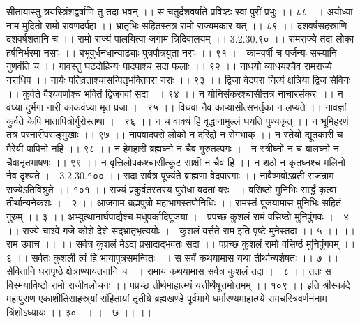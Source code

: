 सीतायास्तु त्रयस्त्रिंशद्वर्षाणि तु तदा भवन् ।।
स चतुर्दशवर्षांते प्रविष्टः स्वां पुरीं प्रभुः ।। ८८ ।।
अयोध्यां नाम मुदितो रामो रावणदर्पहा ।।
भ्रातृभिः सहितस्तत्र रामो राज्यमकार यत् ।। ८९ ।।
दशवर्षसहस्राणि दशवर्षशतानि च ।।
रामो राज्यं पालयित्वा जगाम त्रिदिवालयम् ।। 3.2.30.९० ।।
रामराज्ये तदा लोका हर्षनिर्भरमा नसाः ।।
बभूवुर्धनधान्याढ्याः पुत्रपौत्रयुता नराः ।। ९१ ।।
कामवर्षी च पर्जन्यः सस्यानि गुणवंति च ।।
गावस्तु घटदोहिन्यः पादपाश्च सदा फलाः ।। ९२ ।।
नाधयो व्याधयश्चैव रामराज्ये नराधिप ।।
नार्यः पतिव्रताश्चासन्पितृभक्तिपरा नराः ।। ९३ ।।
द्विजा वेदपरा नित्यं क्षत्रिया द्विज सेविनः ।।
कुर्वते वैश्यवर्णाश्च भक्तिं द्विजगवां सदा ।। ९४ ।।
न योनिसंकरश्चासीत्तत्र नाचारसंकरः ।।
न वंध्या दुर्भगा नारी काकवंध्या मृत प्रजा ।। ९५ ।।
विधवा नैव काप्यासीत्सभर्तृका न लप्यते ।।
नावज्ञां कुर्वते केपि मातापित्रोर्गुरोस्तथा ।। ९६ ।।
न च वाक्यं हि वृद्धानामुल्लं घयति पुण्यकृत् ।।
न भूमिहरणं तत्र परनारीपराङ्मुखाः ।। ९७ ।।
नापवादपरो लोको न दरिद्रो न रोगभाक् ।।
न स्तेयो द्यूतकारी च मैरेयी पापिनो नहि ।। ९८ ।।
न हेमहारी ब्रह्मघ्नो न चैव गुरुतल्पगः ।।
न स्त्रीघ्नो न च बालघ्नो न चैवानृतभाषणः ।। ९९ ।।
न वृत्तिलोपकश्चासीत्कूट साक्षी न चैव हि ।।
न शठो न कृतघ्नश्च मलिनो नैव दृश्यते ।। 3.2.30.१०० ।।
सदा सर्वत्र पूज्यंते ब्राह्मणा वेदपारगाः ।।
नावैष्णवोऽव्रती राजन्राम राज्येऽतिविश्रुते ।। १०१ ।।
राज्यं प्रकुर्वतस्तस्य पुरोधा वदतां वरः ।।
वसिष्ठो मुनिभिः सार्द्धं कृत्वा तीर्थान्यनेकशः ।। २ ।।
आजगाम ब्रह्मपुत्रो महाभागस्तपोनिधिः ।।
रामस्तं पूजयामास मुनिभिः सहितं गुरुम् ।। ३ ।।
अभ्युत्थानार्घपाद्यैश्च मधुपर्कादिपूजया ।।
प्रपच्छ कुशलं रामं वसिष्ठो मुनिपुंगवः ।। ४ ।।
राज्ये चाश्वे गजे कोशे देशे सद्भ्रातृभृत्ययोः ।।
कुशलं वर्त्तते राम इति पृष्टे मुनेस्तदा ।। ५ ।।
।। राम उवाच ।। ।।
सर्वत्र कुशलं मेऽद्य प्रसादाद्भवतः सदा ।।
पप्रच्छ कुशलं रामो वसिष्ठं मुनिपुंगवम् ।। ६ ।।
सर्वतः कुशली त्वं हि भार्यापुत्रसमन्वितः ।।
स सर्वं कथयामास यथा तीर्थान्यशेषतः ।। ७ ।।
सेवितानि धरापृष्ठे क्षेत्राण्यायतनानि च ।।
रामाय कथयामास सर्वत्र कुशलं तदा ।। ८ ।।
ततः स विस्मयाविष्टो रामो राजीवलोचनः ।।
पप्रच्छ तीर्थमाहात्म्यं यत्तीर्थेषूत्तमोत्तमम् ।। १०९ ।।
इति श्रीस्कांदे महापुराण एकाशीतिसाहस्र्यां संहितायां तृतीये ब्रह्मखण्डे पूर्वभागे धर्मारण्यमाहात्म्ये रामचरित्रवर्णनंनाम त्रिंशोऽध्यायः ।। ३० ।। ।। छ ।। ।।


